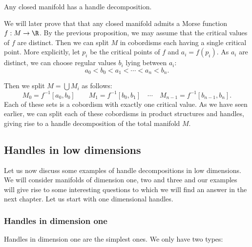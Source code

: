 \begin{theorem}
    Any closed manifold has a handle decomposition.
\end{theorem}
\begin{myproof}
    We will later prove that that any closed manifold admits a Morse function $f: M \to  \R$.
    By the previous proposition, we may assume that the critical values of $f$ are distinct.
    Then we can split $M$ in cobordisms each having a single critical point. 
    More explicitly, let $p_i$ be the critical points of  $f$ and  $a_i = f(p_i)$.
    As $a_i$ are distinct, we can choose regular values $b_i$ lying between $a_i$:
     \[
    a_0 < b_0 < a_1 < \cdots < a_n < b_n
    .\] 
    \begin{marginfigure}[-3cm]
        \centering
        \caption{By splitting up a closed manifold in cobordisms with a single critical point, we find a handle decomposition.}
        \label{fig:any-closed-manifold-admits-a-handlebody-decomposition}
    \end{marginfigure}
    Then we split $M = \bigcup M_i$ as follows:
     \[
         M_0 = f^{-1}[a_0, b_0]\qquad
         M_1 = f^{-1}[b_0, b_1]\quad
         \cdots
         \quad
         M_{n-1} = f^{-1}[b_{n-1}, b_n]
    .\] 
    Each of these sets is a cobordism with exactly one critical value.
    As we have seen earlier, we can split each of these cobordisms in product structures and handles, giving rise to a handle decomposition of the total manifold $M$.
\end{myproof}


\subsection*{Handles in low dimensions}

Let us now discuss some examples of handle decompositions in low dimensions.
We will consider manifolds of dimension one, two and three and our examples will give rise to some interesting questions to which we will find an answer in the next chapter.
Let us start with one dimensional handles.


\newcommand\smallstrutt{\rule[-0.5cm]{0pt}{1.1cm}}
\subsubsection*{Handles in dimension one}
Handles in dimension one are the simplest ones.
We only have two types:

